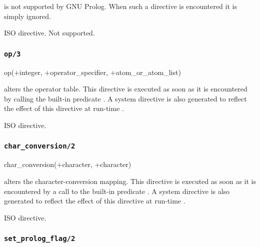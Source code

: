 \Description

 is not supported by GNU Prolog. When such a
directive is encountered it is simply ignored.

\Portability

ISO directive. Not supported.

\subsubsection{\texttt{op/3}}
\label{op/3}

\begin{TemplatesOneCol}
op(+integer, +operator\_specifier, +atom\_or\_atom\_list)

\end{TemplatesOneCol}

\Description

 alters the operator table. This
directive is executed as soon as it is encountered by calling the built-in
predicate  . A system
directive is also generated to reflect the effect of this directive at
run-time .

\Portability

ISO directive.

\subsubsection{\texttt{char\_conversion/2}}

\begin{TemplatesOneCol}
char\_conversion(+character, +character)

\end{TemplatesOneCol}

\Description

 alters the character-conversion
mapping. This directive is executed as soon as it is encountered by a call
to the built-in predicate 
. A system directive is also generated to reflect
the effect of this directive at run-time .

\Portability

ISO directive.

\subsubsection{\texttt{set\_prolog\_flag/2}}


